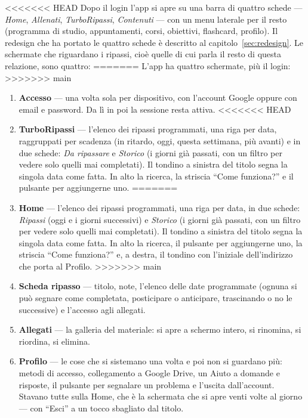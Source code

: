 \documentclass[11pt,a4paper]{report}
\begin{document}
<<<<<<< HEAD
Dopo il login l'app si apre su una barra di quattro schede — \emph{Home},
\emph{Allenati}, \emph{TurboRipassi}, \emph{Contenuti} — con un menu laterale
per il resto (programma di studio, appuntamenti, corsi, obiettivi, flashcard,
profilo). Il redesign che ha portato le quattro schede \`e descritto al
capitolo~\ref{sec:redesign}. Le schermate che riguardano i ripassi, cio\`e
quelle di cui parla il resto di questa relazione, sono quattro:
=======
L'app ha quattro schermate, pi\`u il login:
>>>>>>> main

\begin{enumerate}[nosep]
  \item \textbf{Accesso} — una volta sola per dispositivo, con l'account
        Google oppure con email e password. Da l\`i in poi la sessione resta
        attiva.
<<<<<<< HEAD
  \item \textbf{TurboRipassi} — l'elenco dei ripassi programmati, una riga per
        data, raggruppati per scadenza (in ritardo, oggi, questa settimana,
        pi\`u avanti) e in due schede: \emph{Da ripassare} e \emph{Storico} (i
        giorni gi\`a passati, con un filtro per vedere solo quelli mai
        completati). Il tondino a sinistra del titolo segna la singola data
        come fatta. In alto la ricerca, la striscia ``Come funziona?'' e il
        pulsante per aggiungerne uno.
=======
  \item \textbf{Home} — l'elenco dei ripassi programmati, una riga per
        data, in due schede: \emph{Ripassi} (oggi e i giorni successivi) e
        \emph{Storico} (i giorni gi\`a passati, con un filtro per vedere solo
        quelli mai completati). Il tondino a sinistra del titolo segna la
        singola data come fatta. In alto la ricerca, il pulsante per
        aggiungerne uno, la striscia ``Come funziona?'' e, a destra, il
        tondino con l'iniziale dell'indirizzo che porta al Profilo.
>>>>>>> main
  \item \textbf{Scheda ripasso} — titolo, note, l'elenco delle date
        programmate (ognuna si pu\`o segnare come completata, posticipare o
        anticipare, trascinando o no le successive) e l'accesso agli allegati.
  \item \textbf{Allegati} — la galleria del materiale: si apre a schermo
        intero, si rinomina, si riordina, si elimina.
  \item \textbf{Profilo} — le cose che si sistemano una volta e poi non si
        guardano pi\`u: metodi di accesso, collegamento a Google Drive, un
        Aiuto a domande e risposte, il pulsante per segnalare un problema e
        l'uscita dall'account. Stavano tutte sulla Home, che \`e la schermata
        che si apre venti volte al giorno --- con ``Esci'' a un tocco
        sbagliato dal titolo.
\end{enumerate}
\end{document}
